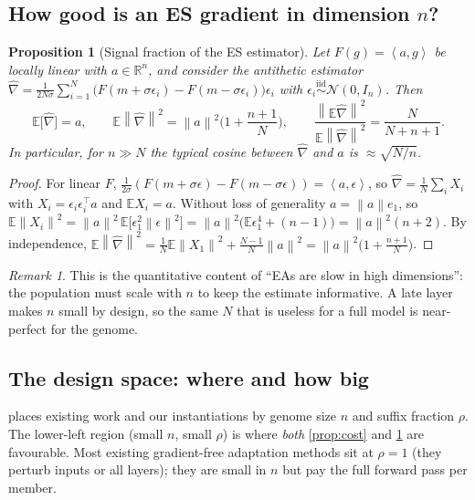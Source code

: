 \documentclass[11pt,a4paper]{article}
\theoremstyle{definition}
\theoremstyle{plain}
\newtheorem{proposition}[definition]{Proposition}
\theoremstyle{remark}
\newtheorem{remark}[definition]{Remark}
\newcommand{\R}{\mathbb{R}}
\newcommand{\E}{\mathbb{E}}
\newcommand{\norm}[1]{\left\lVert #1 \right\rVert}
\newcommand{\ip}[2]{\left\langle #1, #2 \right\rangle}
\begin{document}
\subsection{How good is an ES gradient in dimension $n$?}

\begin{proposition}[Signal fraction of the ES estimator]
\label{prop:alignment}
Let $F(g) = \ip{a}{g}$ be locally linear with $a\in\R^n$, and consider the antithetic estimator $\hat\nabla = \frac{1}{2N\sigma}\sum_{i=1}^N \big(F(m+\sigma\epsilon_i) - F(m-\sigma\epsilon_i)\big)\epsilon_i$ with $\epsilon_i\stackrel{\text{iid}}{\sim}\mathcal{N}(0,I_n)$. Then
\begin{equation}
\E\big[\hat\nabla\big] = a, \qquad \E\norm{\hat\nabla}^2 = \norm{a}^2\Big(1+\frac{n+1}{N}\Big),
\qquad
\frac{\norm{\E\hat\nabla}^2}{\E\norm{\hat\nabla}^2} = \frac{N}{N+n+1}.
\end{equation}
In particular, for $n\gg N$ the typical cosine between $\hat\nabla$ and $a$ is $\approx\sqrt{N/n}$.
\end{proposition}
\begin{proof}
For linear $F$, $\tfrac{1}{2\sigma}(F(m+\sigma\epsilon)-F(m-\sigma\epsilon)) = \ip{a}{\epsilon}$, so $\hat\nabla = \frac1N\sum_i X_i$ with $X_i = \epsilon_i\epsilon_i^\top a$ and $\E X_i = a$. Without loss of generality $a = \norm{a}e_1$, so $\E\norm{X_i}^2 = \norm{a}^2\,\E\big[\epsilon_1^2\norm{\epsilon}^2\big] = \norm{a}^2\big(\E\epsilon_1^4 + (n-1)\big) = \norm{a}^2(n+2)$. By independence, $\E\norm{\hat\nabla}^2 = \frac{1}{N}\E\norm{X_1}^2 + \frac{N-1}{N}\norm{a}^2 = \norm{a}^2\big(1+\frac{n+1}{N}\big)$.
\end{proof}

\begin{remark}
This is the quantitative content of ``EAs are slow in high dimensions'': the population must scale with $n$ to keep the estimate informative. A late layer makes $n$ small by design, so the same $N$ that is useless for a full model is near-perfect for the genome.
\end{remark}

\subsection{The design space: where and how big}

 places existing work and our instantiations by genome size $n$ and suffix fraction $\rho$. The lower-left region (small $n$, small $\rho$) is where \emph{both} \cref{prop:cost} and \cref{prop:alignment} are favourable. Most existing gradient-free adaptation methods sit at $\rho = 1$ (they perturb inputs or all layers); they are small in $n$ but pay the full forward pass per member.
\end{document}
